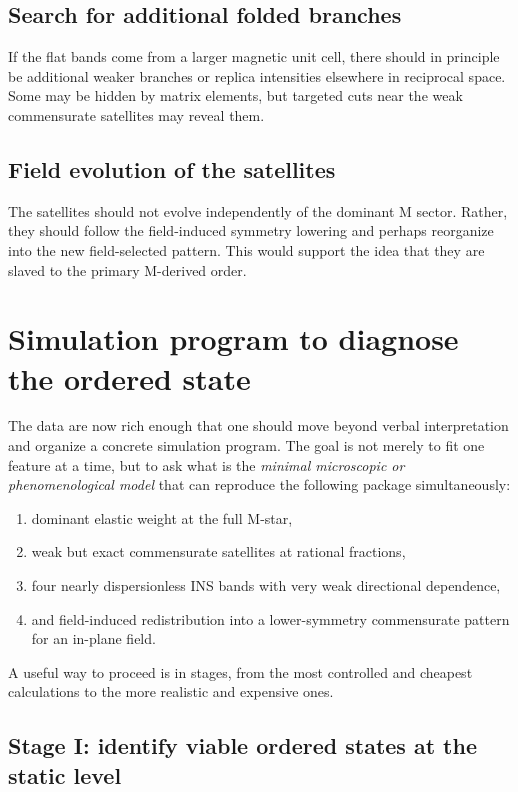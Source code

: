 \documentclass[11pt]{article}
\begin{document}
\subsection{Search for additional folded branches}

If the flat bands come from a larger magnetic unit cell, there should in principle be additional weaker branches or replica intensities elsewhere in reciprocal space. Some may be hidden by matrix elements, but targeted cuts near the weak commensurate satellites may reveal them.

\subsection{Field evolution of the satellites}

The satellites should not evolve independently of the dominant M sector. Rather, they should follow the field-induced symmetry lowering and perhaps reorganize into the new field-selected pattern. This would support the idea that they are slaved to the primary M-derived order.


\section{Simulation program to diagnose the ordered state}

The data are now rich enough that one should move beyond verbal interpretation and organize a concrete simulation program. The goal is not merely to fit one feature at a time, but to ask what is the \emph{minimal microscopic or phenomenological model} that can reproduce the following package simultaneously:
\begin{enumerate}[leftmargin=2em,itemsep=0.35em]
    \item dominant elastic weight at the full M-star,
    \item weak but exact commensurate satellites at rational fractions,
    \item four nearly dispersionless INS bands with very weak directional dependence,
    \item and field-induced redistribution into a lower-symmetry commensurate pattern for an in-plane field.
\end{enumerate}

A useful way to proceed is in stages, from the most controlled and cheapest calculations to the more realistic and expensive ones.

\subsection{Stage I: identify viable ordered states at the static level}
\end{document}
